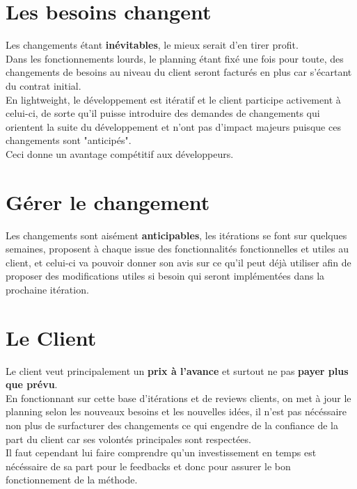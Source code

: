 \documentclass{report}
\begin{document}
	\section{Les besoins changent}

		Les changements étant \textbf{inévitables}, le mieux serait d'en tirer profit.\\

		Dans les fonctionnements lourds, le planning étant fixé une fois pour toute, des changements de besoins au niveau du client seront facturés en plus car s'écartant du contrat initial.\\

		En lightweight, le développement est itératif et le client participe activement à celui-ci, de sorte qu'il puisse introduire des demandes de changements qui orientent la suite du développement et n'ont pas d'impact majeurs puisque ces changements sont "anticipés".\\
		Ceci donne un avantage compétitif aux développeurs.\\

	\section{Gérer le changement}

		Les changements sont aisément \textbf{anticipables}, les itérations se font sur quelques semaines, proposent à chaque issue des fonctionnalités fonctionnelles et utiles au client, et celui-ci va pouvoir donner son avis sur ce qu'il peut déjà utiliser afin de proposer des modifications utiles si besoin qui seront implémentées dans la prochaine itération.\\

	\section{Le Client}

		Le client veut principalement un \textbf{prix à l'avance} et surtout ne pas \textbf{payer plus que prévu}.\\
		En fonctionnant sur cette base d'itérations et de reviews clients, on met à jour le planning selon les nouveaux besoins et les nouvelles idées, il n'est pas nécéssaire non plus de surfacturer des changements ce qui engendre de la confiance de la part du client car ses volontés principales sont respectées.\\
		Il faut cependant lui faire comprendre qu'un investissement en temps est nécéssaire de sa part pour le feedbacks et donc pour assurer le bon fonctionnement de la méthode.\\
\end{document}

